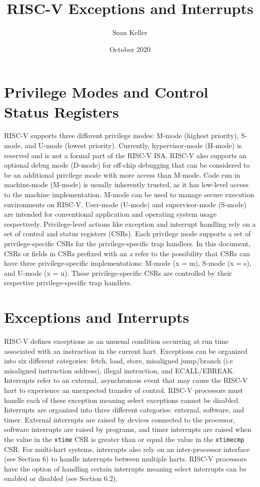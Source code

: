 \documentclass[12pt]{article}
\title{RISC-V Exceptions and Interrupts}
\author{Sean Keller}
\date{October 2020}
\begin{document}
\maketitle
\newpage

\section{Privilege Modes and Control Status Registers}
RISC-V supports three different privilege modes: M-mode (highest priority), S-mode, and U-mode (lowest priority). Currently, hypervisor-mode (H-mode) is reserved and is not a formal part of the RISC-V ISA. RISC-V also supports an optional debug mode (D-mode) for off-chip debugging that can be considered to be an additional privilege mode with more access than M-mode. Code run in machine-mode (M-mode) is usually inherently trusted, as it has low-level access to the machine implementation. M-mode can be used to manage secure execution environments on RISC-V. User-mode (U-mode) and supervisor-mode (S-mode) are intended for conventional application and operating system usage respectively. Privilege-level actions like exception and interrupt handling rely on a set of control and status registers (CSRs). Each privilege mode supports a set of privilege-specific CSRs for the privilege-specific trap handlers. In this document, CSRs or fields in CSRs prefixed with an \emph{x} refer to the possibility that CSRs can have three privilege-specific implementations: M-mode (x = m), S-mode (x = s), and U-mode (x = u). These privilege-specific CSRs are controlled by their respective privilege-specific trap handlers.

\section{Exceptions and Interrupts}
RISC-V defines exceptions as an unusual condition occurring at run time associated with an instruction in the current hart. Exceptions can be organized into six different categories: fetch, load, store, misaligned jump/branch (i.e misaligned instruction address), illegal instruction, and ECALL/EBREAK. Interrupts refer to an external, asynchronous event that may cause the RISC-V hart to experience an unexpected transfer of control. RISC-V processors must handle each of these exception meaning select exceptions cannot be disabled. Interrupts are organized into three different categories: external, software, and timer. External interrupts are raised by devices connected to the processor, software interrupts are raised by programs, and timer interrupts are raised when the value in the {\tt{xtime}} CSR is greater than or equal the value in the {\tt{xtimecmp}} CSR. For multi-hart systems, interrupts also rely on an inter-processor interface (see Section 6) to handle interrupts between multiple harts. RISC-V processors have the option of handling certain interrupts meaning select interrupts can be enabled or disabled (see Section 6.2). 
\end{document}
